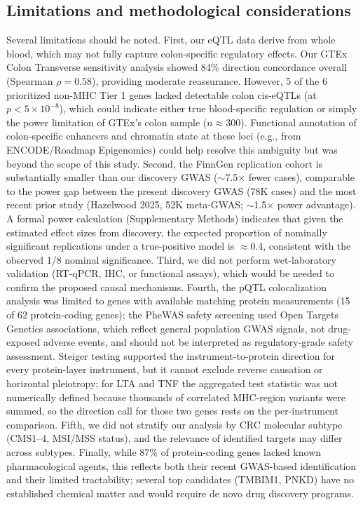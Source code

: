 \documentclass[11pt,a4paper]{article}
\begin{document}
\subsection*{Limitations and methodological considerations}

Several limitations should be noted. First, our eQTL data derive from whole
blood, which may not fully capture colon-specific regulatory effects. Our GTEx
Colon Transverse sensitivity analysis showed 84\% direction concordance
overall (Spearman $\rho = 0.58$), providing moderate reassurance. However, 5 of the 6 prioritized non-MHC Tier 1 genes lacked detectable colon cis-eQTLs (at $p < 5\times10^{-8}$),
which could indicate either true blood-specific regulation or simply the power
limitation of GTEx's colon sample ($n\approx300$). Functional annotation of
colon-specific enhancers and chromatin state at these loci (e.g., from
ENCODE/Roadmap Epigenomics) could help resolve this ambiguity but was beyond
the scope of this study. Second, the FinnGen replication cohort is
substantially smaller than our discovery GWAS ($\sim$7.5$\times$ fewer cases),
comparable to the power gap between the present discovery GWAS (78K cases)
and the most recent prior study (Hazelwood 2025, 52K meta-GWAS; $\sim$1.5$\times$
power advantage). A formal power calculation (Supplementary Methods) indicates
that given the estimated effect sizes from discovery, the expected proportion
of nominally significant replications under a true-positive model is
$\approx$0.4, consistent with the observed 1/8 nominal significance. Third, we
did not perform wet-laboratory validation (RT-qPCR, IHC, or functional assays),
which would be needed to confirm the proposed causal mechanisms. Fourth, the
pQTL colocalization analysis was limited to genes with available matching
protein measurements (15 of 62 protein-coding genes); the PheWAS safety
screening used Open Targets Genetics associations, which reflect general
population GWAS signals, not drug-exposed adverse events, and should
not be interpreted as regulatory-grade safety assessment. Steiger testing supported the instrument-to-protein direction for every protein-layer instrument, but it cannot exclude reverse causation or horizontal pleiotropy; for LTA and TNF the aggregated test statistic was not numerically defined because thousands of correlated MHC-region variants were summed, so the direction call for those two genes rests on the per-instrument comparison. Fifth, we did not
stratify our analysis by CRC molecular subtype (CMS1--4, MSI/MSS status), and
the relevance of identified targets may differ across subtypes. Finally, while
87\% of protein-coding genes lacked known pharmacological agents, this reflects
both their recent GWAS-based identification and their limited tractability;
several top candidates (TMBIM1, PNKD) have no established chemical matter and
would require de novo drug discovery programs.
\end{document}

